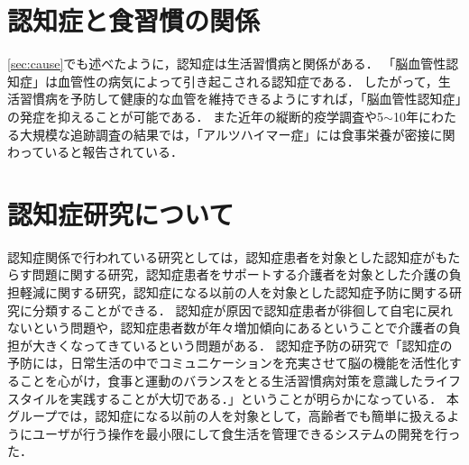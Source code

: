 \documentclass[../report]{subfiles}
\begin{document}
\section{認知症と食習慣の関係}
\ref{sec:cause}でも述べたように，認知症は生活習慣病と関係がある．
「脳血管性認知症」は血管性の病気によって引き起こされる認知症である．
したがって，生活習慣病を予防して健康的な血管を維持できるようにすれば，「脳血管性認知症」の発症を抑えることが可能である．
また近年の縦断的疫学調査や5$\sim$10年にわたる大規模な追跡調査の結果では，「アルツハイマー症」には食事栄養が密接に関わっていると報告されている\cite{nutrition-dementia-00}\cite{nutrition-dementia-01}．


\section{認知症研究について}
認知症関係で行われている研究としては，認知症患者を対象とした認知症がもたらす問題に関する研究，認知症患者をサポートする介護者を対象とした介護の負担軽減に関する研究，認知症になる以前の人を対象とした認知症予防に関する研究に分類することができる．
認知症が原因で認知症患者が徘徊して自宅に戻れないという問題や，認知症患者数が年々増加傾向にあるということで介護者の負担が大きくなってきているという問題がある．
認知症予防の研究で「認知症の予防には，日常生活の中でコミュニケーションを充実させて脳の機能を活性化することを心がけ，食事と運動のバランスをとる生活習慣病対策を意識したライフスタイルを実践することが大切である．」\cite{dementia-prevention}ということが明らかになっている．
本グループでは，認知症になる以前の人を対象として，高齢者でも簡単に扱えるようにユーザが行う操作を最小限にして食生活を管理できるシステムの開発を行った．
\end{document}
